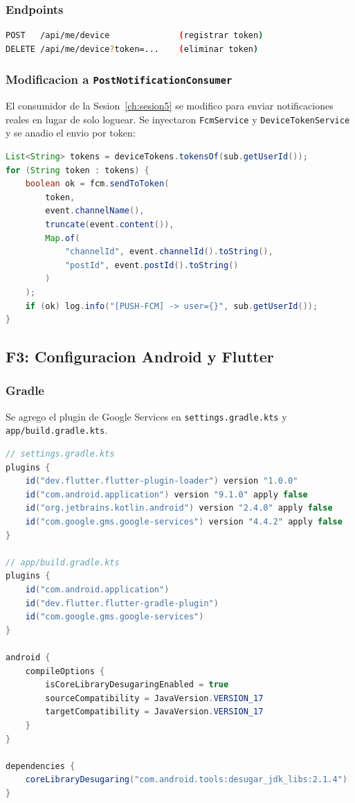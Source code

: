 \subsubsection{Endpoints}

\begin{lstlisting}[language=bash]
POST   /api/me/device              (registrar token)
DELETE /api/me/device?token=...    (eliminar token)
\end{lstlisting}

\subsubsection{Modificacion a \texttt{PostNotificationConsumer}}

\begin{aviso}
El consumidor de la Sesion~\ref{ch:sesion5} se modifico para enviar notificaciones reales en lugar de solo loguear. Se inyectaron \texttt{FcmService} y \texttt{DeviceTokenService} y se anadio el envio por token:

\begin{lstlisting}[language=Java]
List<String> tokens = deviceTokens.tokensOf(sub.getUserId());
for (String token : tokens) {
    boolean ok = fcm.sendToToken(
        token,
        event.channelName(),
        truncate(event.content()),
        Map.of(
            "channelId", event.channelId().toString(),
            "postId", event.postId().toString()
        )
    );
    if (ok) log.info("[PUSH-FCM] -> user={}", sub.getUserId());
}
\end{lstlisting}
\end{aviso}

\subsection{F3: Configuracion Android y Flutter}

\subsubsection{Gradle}

Se agrego el plugin de Google Services en \texttt{settings.gradle.kts} y \texttt{app/build.gradle.kts}.

\begin{lstlisting}[language=Java]
// settings.gradle.kts
plugins {
    id("dev.flutter.flutter-plugin-loader") version "1.0.0"
    id("com.android.application") version "9.1.0" apply false
    id("org.jetbrains.kotlin.android") version "2.4.0" apply false
    id("com.google.gms.google-services") version "4.4.2" apply false
}

// app/build.gradle.kts
plugins {
    id("com.android.application")
    id("dev.flutter.flutter-gradle-plugin")
    id("com.google.gms.google-services")
}

android {
    compileOptions {
        isCoreLibraryDesugaringEnabled = true
        sourceCompatibility = JavaVersion.VERSION_17
        targetCompatibility = JavaVersion.VERSION_17
    }
}

dependencies {
    coreLibraryDesugaring("com.android.tools:desugar_jdk_libs:2.1.4")
}
\end{lstlisting}

